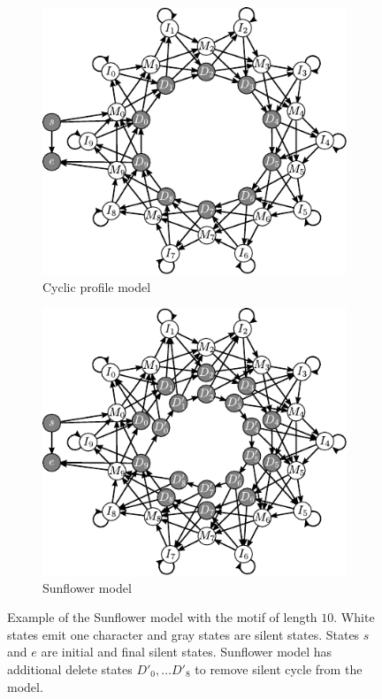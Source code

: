 \begin{figure}
\begin{center}
\begin{subfigure}[b]{0.5\textwidth}
\includegraphics{../figures/SunflowerSilentCircle.pdf}
\caption{Cyclic profile model}\label{SUBFIGURE:SUNFLOWERSILENTCYCLE}
\end{subfigure}%
\begin{subfigure}[b]{0.5\textwidth}
\includegraphics{../figures/Sunflower.pdf}
\caption{Sunflower model}\label{SUBFIGURE:SUNFLOWER}
\end{subfigure}
\end{center}
\caption[Sunflower model]{Example of the Sunflower model 
with the motif of length $10$. White states emit one character and gray states are
silent states. States $s$ and $e$ are initial and final silent states. Sunflower model
has additional delete states $D'_0, \dots D'_8$ to remove silent cycle from the
model.}
\label{FIGURE:SUNFLOWERMODEL}
\end{figure}

